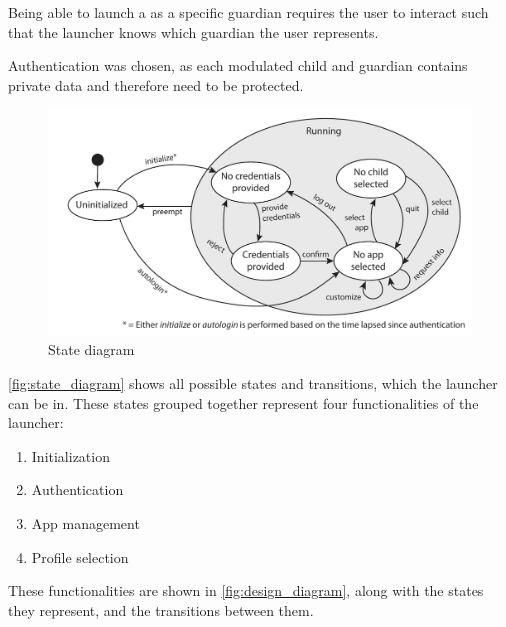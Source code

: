 Being able to launch a \girafapp[] as a specific guardian requires the user to interact such that the launcher knows which guardian the user represents.

Authentication was chosen, as each modulated child and guardian contains private data and therefore need to be protected.

\begin{figure}[h]
	\centering
	\includegraphics[width=1\textwidth]{gfx/statediagram.pdf}
	\caption{State diagram}
	\label{fig:state_diagram}
\end{figure}


\autoref{fig:state_diagram} shows all possible states and transitions, which the launcher can be in. 
These states grouped together represent four functionalities of the launcher:

\begin{enumerate}
	\item Initialization
	\item Authentication
	\item App management
	\item Profile selection
\end{enumerate}

These functionalities are shown in \autoref{fig:design_diagram}, along with the states they represent, and the transitions between them.

